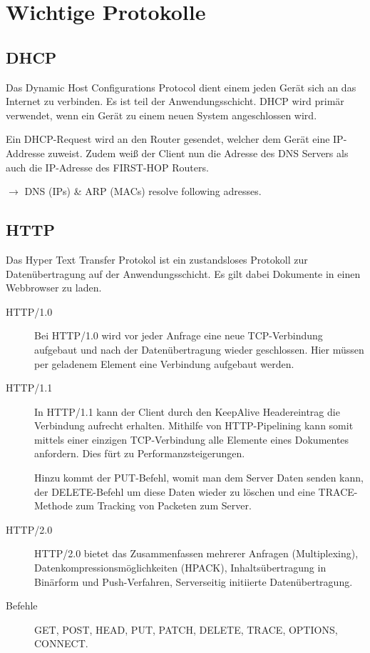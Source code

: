 \documentclass{scrartcl}
\begin{document}
\section{Wichtige Protokolle}   
    \subsection{DHCP}
    \label{protocols:dhcp}
    Das Dynamic Host Configurations Protocol dient einem jeden Gerät sich an das Internet zu verbinden. 
    Es ist teil der Anwendungsschicht. 
    DHCP wird primär verwendet, wenn ein Gerät zu einem neuen System angeschlossen wird.
    
    Ein DHCP-Request wird an den Router gesendet, welcher dem Gerät eine IP-Addresse zuweist. 
    Zudem weiß der Client nun die Adresse des DNS Servers als auch die IP-Adresse des FIRST-HOP Routers.
    
    $\rightarrow$ DNS (IPs) \& ARP (MACs) resolve following adresses.
    
    \subsection{HTTP}
    \label{protocols:http}
    Das Hyper Text Transfer Protokol ist ein zustandsloses Protokoll zur Datenübertragung auf der Anwendungsschicht. 
    Es gilt dabei Dokumente in einen Webbrowser zu laden.
    \begin{description}
        \item [HTTP/1.0] Bei HTTP/1.0 wird vor jeder Anfrage eine neue TCP-Verbindung aufgebaut und nach der Datenübertragung wieder geschlossen. 
        Hier müssen per geladenem Element eine Verbindung aufgebaut werden.
        \item [HTTP/1.1] In HTTP/1.1 kann der Client durch den KeepAlive Headereintrag die Verbindung aufrecht erhalten. 
        Mithilfe von HTTP-Pipelining kann somit mittels einer einzigen TCP-Verbindung alle Elemente eines Dokumentes anfordern. Dies fürt zu Performanzsteigerungen.
        
        Hinzu kommt der PUT-Befehl, womit man dem Server Daten senden kann, der DELETE-Befehl um diese Daten wieder zu löschen und eine TRACE-Methode zum Tracking von Packeten zum Server. 
        \item [HTTP/2.0] HTTP/2.0 bietet das Zusammenfassen mehrerer Anfragen (Multiplexing), Datenkompressionsmöglichkeiten (HPACK), Inhaltsübertragung in Binärform und Push-Verfahren, Serverseitig initiierte Datenübertragung.
        \item [Befehle] GET, POST, HEAD, PUT, PATCH, DELETE, TRACE, OPTIONS, CONNECT.
    \end{description}
    
\end{document}
